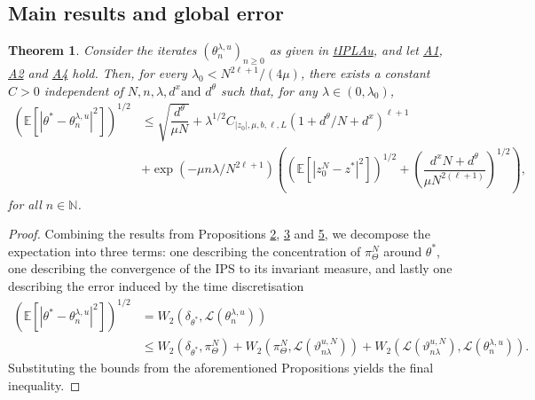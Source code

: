 \documentclass[a4paper, 10pt]{article}
\theoremstyle{plain}%
\newtheorem{theorem}{Theorem}
\begin{document}
\subsection{Main results and global error}
\begin{theorem} \label{theorem:1}Consider the iterates $({\theta}^{\lambda,u}_{n})_{n\geq 0}$ as given in \hyperref[algo1]{tIPLAu}, and let \hyperlink{Assum1}{A1}, \hyperlink{Assum2}{A2} and \hyperlink{Assum4}{A4} hold. Then, for every $\lambda_0<N^{2\ell+1}/(4\mu)$, there exists a constant $C>0$ independent of $N,n,\lambda,d^x \text{and } d^{\theta}$ such that, for any $\lambda\in(0,\lambda_0)$,
\begin{align*}
\left(\mathbb{E}\left[|{\theta}^{*}-{\theta}^{\lambda,u}_{n}|^2\right]\right)^{1/2}&\leq \sqrt{\dfrac{d^{\theta}}{\mu N}}+\lambda^{1/2} C_{|z_0|,\mu,b,\ell,L}(1+d^{\theta}/N+d^x)^{\ell+1}\\&+\exp{(-\mu n\lambda/N^{2\ell+1})}\left(\left(\mathbb{E}\left[|z_0^N-z^*|^2\right]\right)^{1/2}+\left(\dfrac{d^x N+d^{\theta}}{\mu N^{2(\ell+1)}}\right)^{1/2}\right),
\end{align*}
for all $n\in\mathbb{N}$.\end{theorem}
\begin{proof}
    Combining the results from Propositions \hyperlink{Prop2}{2}, \hyperlink{Prop3}{3} and \hyperlink{Prop5}{5}, we decompose the expectation into three terms: one describing the concentration of $\pi_{\Theta}^N$ around $\theta^*$, one describing the convergence of the IPS to its invariant measure, and lastly one describing the error induced by the time discretisation
\begin{align}
\left(\mathbb{E}\left[|{\theta}^{*}-{\theta}^{\lambda,u}_{n}|^2\right]\right)^{1/2}&=W_2(\delta_{\theta^*},\mathcal{L}(\theta^{\lambda,u}_{n}))\nonumber\\
&\leq W_2(\delta_{\theta^*},\pi_{\Theta}^N)+W_2(\pi_{\Theta}^N,\mathcal{L}(\vartheta^{u,N}_{n\lambda}))+W_2(\mathcal{L}(\vartheta^{u,N}_{n\lambda}),\mathcal{L}(\theta_{n}^{\lambda,u})).\label{eq:31}
\end{align}
Substituting the bounds from the aforementioned Propositions yields the final inequality.
\end{proof}
\end{document}
